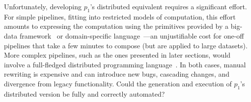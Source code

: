 \documentclass[sigplan,10pt,review,anonymous]{acmart}
\newcommand{\eg}{{\em e.g.}, }
\newcommand{\ttt}[1]{\texttt{\small #1}}
\begin{document}
Unfortunately, developing $p_1$'s distributed equivalent requires a significant effort.
For simple pipelines, fitting into restricted models of computation, this effort amounts to expressing the computation using the primitives provided by a big-data framework~\cite{mapreduce:08, ciel:11, spark:12, naiad:13} or domain-specific language~\cite{alvaro2011consistency, distal:13, meiklejohn2015lasp}---an unjustifiable cost for one-off pipelines that take a few minutes to compose (but are applied to large datasets).
More complex pipelines, such as the ones presented in later sections, would involve a full-fledged distributed programming language~\cite{erlang:96, lopes1997d, acute:05, mace:07, cloudhaskell:11, ScalaLoci:18}. %
In both cases, manual rewriting is expensive and can introduce new bugs, cascading changes, and divergence from legacy functionality.
Could the generation and execution of $p_1$'s distributed version be fully and correctly automated?

% 
% 
% 
% 
% 
% 
% 
% 
\end{document}
